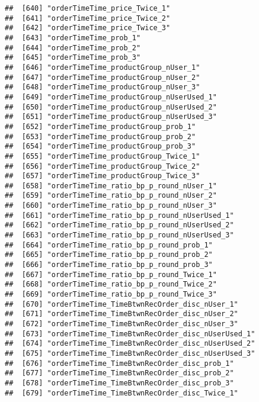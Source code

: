 \documentclass[10pt]{report}
\begin{document}
\begin{verbatim}
##  [640] "orderTimeTime_price_Twice_1"                          
##  [641] "orderTimeTime_price_Twice_2"                          
##  [642] "orderTimeTime_price_Twice_3"                          
##  [643] "orderTimeTime_prob_1"                                 
##  [644] "orderTimeTime_prob_2"                                 
##  [645] "orderTimeTime_prob_3"                                 
##  [646] "orderTimeTime_productGroup_nUser_1"                   
##  [647] "orderTimeTime_productGroup_nUser_2"                   
##  [648] "orderTimeTime_productGroup_nUser_3"                   
##  [649] "orderTimeTime_productGroup_nUserUsed_1"               
##  [650] "orderTimeTime_productGroup_nUserUsed_2"               
##  [651] "orderTimeTime_productGroup_nUserUsed_3"               
##  [652] "orderTimeTime_productGroup_prob_1"                    
##  [653] "orderTimeTime_productGroup_prob_2"                    
##  [654] "orderTimeTime_productGroup_prob_3"                    
##  [655] "orderTimeTime_productGroup_Twice_1"                   
##  [656] "orderTimeTime_productGroup_Twice_2"                   
##  [657] "orderTimeTime_productGroup_Twice_3"                   
##  [658] "orderTimeTime_ratio_bp_p_round_nUser_1"               
##  [659] "orderTimeTime_ratio_bp_p_round_nUser_2"               
##  [660] "orderTimeTime_ratio_bp_p_round_nUser_3"               
##  [661] "orderTimeTime_ratio_bp_p_round_nUserUsed_1"           
##  [662] "orderTimeTime_ratio_bp_p_round_nUserUsed_2"           
##  [663] "orderTimeTime_ratio_bp_p_round_nUserUsed_3"           
##  [664] "orderTimeTime_ratio_bp_p_round_prob_1"                
##  [665] "orderTimeTime_ratio_bp_p_round_prob_2"                
##  [666] "orderTimeTime_ratio_bp_p_round_prob_3"                
##  [667] "orderTimeTime_ratio_bp_p_round_Twice_1"               
##  [668] "orderTimeTime_ratio_bp_p_round_Twice_2"               
##  [669] "orderTimeTime_ratio_bp_p_round_Twice_3"               
##  [670] "orderTimeTime_TimeBtwnRecOrder_disc_nUser_1"          
##  [671] "orderTimeTime_TimeBtwnRecOrder_disc_nUser_2"          
##  [672] "orderTimeTime_TimeBtwnRecOrder_disc_nUser_3"          
##  [673] "orderTimeTime_TimeBtwnRecOrder_disc_nUserUsed_1"      
##  [674] "orderTimeTime_TimeBtwnRecOrder_disc_nUserUsed_2"      
##  [675] "orderTimeTime_TimeBtwnRecOrder_disc_nUserUsed_3"      
##  [676] "orderTimeTime_TimeBtwnRecOrder_disc_prob_1"           
##  [677] "orderTimeTime_TimeBtwnRecOrder_disc_prob_2"           
##  [678] "orderTimeTime_TimeBtwnRecOrder_disc_prob_3"           
##  [679] "orderTimeTime_TimeBtwnRecOrder_disc_Twice_1"          

\end{verbatim}
\end{document}
